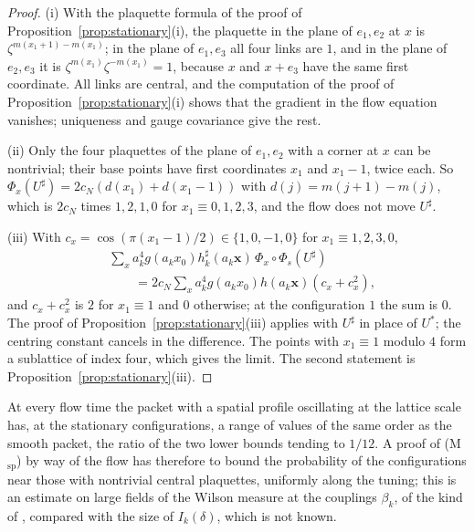 \documentclass[aps,prd,twocolumn,superscriptaddress,nofootinbib,longbibliography,floatfix,amsmath,amssymb,10pt]{revtex4-2}
\theoremstyle{definition}
\theoremstyle{remark}
\begin{document}
\begin{proof}
(i) With the plaquette formula of the proof of
Proposition~\ref{prop:stationary}(i), the plaquette in the plane of $e_1,e_2$
at $x$ is $\zeta^{m(x_1+1)-m(x_1)}$; in the plane of $e_1,e_3$ all four links
are $1$, and in the plane of $e_2,e_3$ it is $\zeta^{m(x_1)}\zeta^{-m(x_1)}
=1$, because $x$ and $x+e_3$ have the same first coordinate. All links are
central, and the computation of the proof of
Proposition~\ref{prop:stationary}(i) shows that the gradient in the flow
equation vanishes; uniqueness and gauge covariance give the rest.

(ii) Only the four plaquettes of the plane of $e_1,e_2$ with a corner at
$x$ can be nontrivial; their base points have first coordinates $x_1$ and
$x_1-1$, twice each. So $\Phi_x(U^\sharp)=2c_N(d(x_1)+d(x_1-1))$ with
$d(j)=m(j+1)-m(j)$, which is $2c_N$ times $1,2,1,0$ for $x_1\equiv0,1,2,3$,
and the flow does not move $U^\sharp$.

(iii) With $c_x=\cos(\pi(x_1-1)/2)\in\{1,0,-1,0\}$ for $x_1\equiv1,2,3,0$,
\[
\begin{split}
&\sum_xa_k^4g(a_kx_0)h^\sharp_k(a_k\mathbf x)\,\Phi_x\circ\Phi_s(U^\sharp)\\
&\qquad=2c_N\sum_xa_k^4g(a_kx_0)h(a_k\mathbf x)(c_x+c_x^2) ,
\end{split}
\]
and $c_x+c_x^2$ is $2$ for $x_1\equiv1$ and $0$ otherwise; at the
configuration $1$ the sum is $0$. The proof of
Proposition~\ref{prop:stationary}(iii) applies with $U^\sharp$ in place of
$U^*$; the centring constant cancels in the difference. The points with
$x_1\equiv1$ modulo $4$ form a sublattice of index four, which gives the
limit. The second statement is Proposition~\ref{prop:stationary}(iii).
\end{proof}

At every flow time the packet with a spatial profile oscillating at the
lattice scale has, at the stationary configurations, a range of values of
the same order as the smooth packet, the ratio of the two lower bounds
tending to $1/12$. A proof of (M$_{\mathrm{sp}}$) by way of the flow has
therefore to bound the probability of the configurations near those with
nontrivial central plaquettes, uniformly along the tuning; this is an
estimate on large fields of the Wilson measure at the couplings $\beta_k$,
of the kind of \cite[Sec.~XII\,E]{BBLR26}, compared with the size of
$I_k(\delta)$, which is not known.
\end{document}
